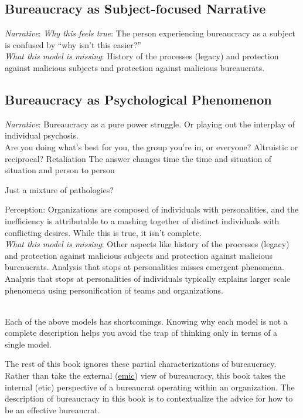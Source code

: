 \subsection{Bureaucracy as Subject-focused Narrative}
\textit{Narrative}: 
\textit{Why this feels true}: The person experiencing bureaucracy as a subject is confused by ``why isn't this easier?''  \\
\textit{What this model is missing}: History of the processes (legacy) and protection against malicious subjects and protection against malicious bureaucrats. 


\subsection{Bureaucracy as Psychological Phenomenon}

\textit{Narrative}: Bureaucracy as a pure power struggle. Or playing out the interplay of individual psychosis. \\

Are you doing what's best for you, the group you're in, or everyone?
Altruistic or reciprocal? Retaliation
The answer changes time the time and situation of situation and person to person

Just a mixture of pathologies?

Perception: Organizations are composed of individuals with personalities, and the inefficiency is attributable to a mashing together of distinct individuals with conflicting desires.
While this is true, it isn't complete. \\
\textit{What this model is missing}: Other aspects like history of the processes (legacy) and protection against malicious subjects and protection against malicious bureaucrats. Analysis that stops at personalities misses emergent phenomena. Analysis that stops at personalities of individuals typically explains larger scale phenomena using personification of teams and organizations. 



\ \\

Each of the above models has shortcomings. Knowing why each model is not a complete description helps you avoid the trap of thinking only in terms of a single model. 

The rest of this book ignores these partial characterizations of bureaucracy. 
Rather than take the external (\href{https://en.wikipedia.org/wiki/Emic_and_etic}{emic}) view of bureaucracy, this book takes the internal (etic) perspective of a bureaucrat operating within an organization. 
The description of bureaucracy in this book is to contextualize the advice for how to be an effective bureaucrat. 